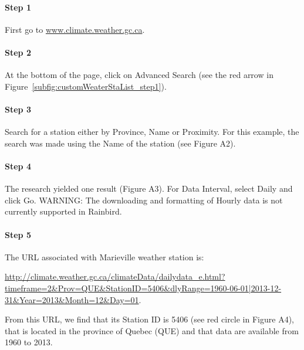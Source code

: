\documentclass[12pt, letterpaper, fleqn]{report}
\begin{document}
\paragraph{Step 1} First go to \url{www.climate.weather.gc.ca}.

\paragraph{Step 2} At the bottom of the page, click on Advanced Search (see the red arrow in Figure~\ref{subfig:customWeaterStaList_step1}).

\paragraph{Step 3} Search for a station either by Province, Name or Proximity. For this example, the search was made using the Name of the station (see Figure A2).

\paragraph{Step 4} The research yielded one result (Figure A3). For Data Interval, select Daily and click Go.
	WARNING: The downloading and formatting of Hourly data is not currently supported in Rainbird.

\paragraph{Step 5} The URL associated with Marieville weather station is:\\[0.1cm]

\begin{sloppypar}
\noindent
\url{http://climate.weather.gc.ca/climateData/dailydata_e.html?timeframe=2&Prov=QUE&StationID=5406&dlyRange=1960-06-01|2013-12-31&Year=2013&Month=12&Day=01}.\\[0.1cm]
\end{sloppypar}

From this URL, we find that its Station ID is 5406 (see red circle in Figure A4), that is located in the province of Quebec (QUE) and that data are available from 1960 to 2013.
\end{document}
